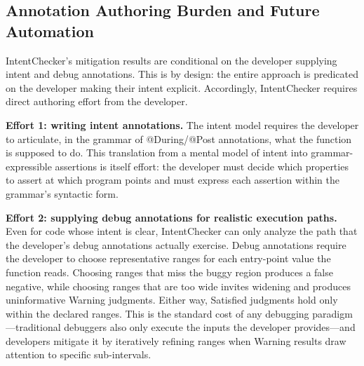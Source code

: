 \documentclass[pdflatex,sn-basic]{sn-jnl}%
\theoremstyle{thmstyleone}%
\theoremstyle{thmstyletwo}%
\theoremstyle{thmstylethree}%
\begin{document}
\subsection{Annotation Authoring Burden and Future Automation}\label{sec:disc:burden}

IntentChecker's mitigation results are conditional on the developer supplying intent and debug annotations.
This is by design: the entire approach is predicated on the developer making their intent explicit. Accordingly, IntentChecker requires direct authoring effort from the developer.

\smallskip
\noindent\textbf{Effort 1: writing intent annotations.}
The intent model requires the developer to articulate, in the grammar of @During/@Post annotations, what the function is supposed to do. This translation from a mental model of intent into grammar-expressible assertions is itself effort: the developer must decide which properties to assert at which program points and must express each assertion within the grammar's syntactic form.

\smallskip
\noindent\textbf{Effort 2: supplying debug annotations for realistic execution paths.}
Even for code whose intent is clear, IntentChecker can only analyze the path that the developer's debug annotations actually exercise.
Debug annotations require the developer to choose representative ranges for each entry-point value the function reads. Choosing ranges that miss the buggy region produces a false negative, while choosing ranges that are too wide invites widening and produces uninformative Warning judgments. Either way, Satisfied judgments hold only within the declared ranges.
This is the standard cost of any debugging paradigm---traditional debuggers also only execute the inputs the developer provides---and developers mitigate it by iteratively refining ranges when Warning results draw attention to specific sub-intervals.
\end{document}
